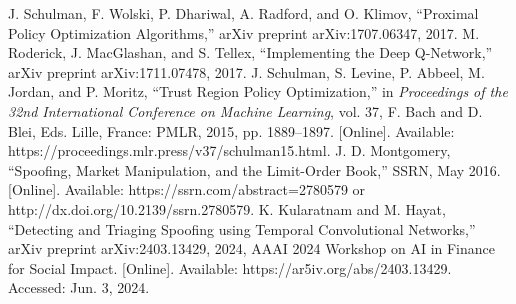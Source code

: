 \documentclass[conference]{IEEEtran}
\begin{document}
\begin{thebibliography}{00}
 J. Schulman, F. Wolski, P. Dhariwal, A. Radford, and O. Klimov, ``Proximal Policy Optimization Algorithms,'' arXiv preprint arXiv:1707.06347, 2017.
 M. Roderick, J. MacGlashan, and S. Tellex, ``Implementing the Deep Q-Network,'' arXiv preprint arXiv:1711.07478, 2017.
 J. Schulman, S. Levine, P. Abbeel, M. Jordan, and P. Moritz, ``Trust Region Policy Optimization,'' in \textit{Proceedings of the 32nd International Conference on Machine Learning}, vol. 37, F. Bach and D. Blei, Eds. Lille, France: PMLR, 2015, pp. 1889--1897. [Online]. Available: https://proceedings.mlr.press/v37/schulman15.html.
 J. D. Montgomery, ``Spoofing, Market Manipulation, and the Limit-Order Book,'' SSRN, May 2016. [Online]. Available: https://ssrn.com/abstract=2780579 or http://dx.doi.org/10.2139/ssrn.2780579.
 K. Kularatnam and M. Hayat, ``Detecting and Triaging Spoofing using Temporal Convolutional Networks,'' arXiv preprint arXiv:2403.13429, 2024, AAAI 2024 Workshop on AI in Finance for Social Impact. [Online]. Available: https://ar5iv.org/abs/2403.13429. Accessed: Jun. 3, 2024.
\end{thebibliography}
\end{document}
